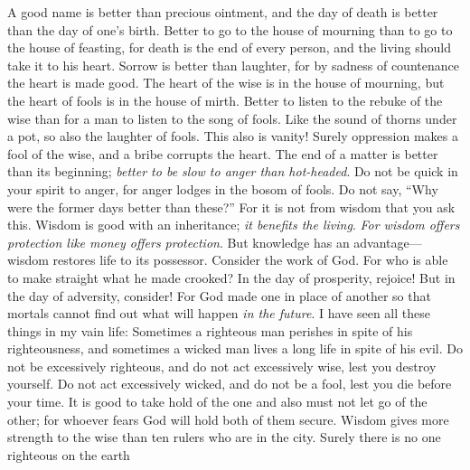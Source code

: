 \begin{biblechapter} %
 A good name is better than precious ointment, 
and the day of death is better than the day of one’s birth.
\verse Better to go to the house of mourning 
than to go to the house of feasting, 
for death is the end of every person, 
and the living should take it to his heart.
\verse Sorrow is better than laughter, 
for by sadness of countenance the heart is made good.
\verse The heart of the wise is in the house of mourning, 
but the heart of fools is in the house of mirth.
\verse Better to listen to the rebuke of the wise 
than for a man to listen to the song of fools.
\verse Like the sound of thorns under a pot, 
so also the laughter of fools. 
This also is vanity!
 Surely oppression makes a fool of the wise, 
and a bribe corrupts the heart.
\verse The end of a matter is better than its beginning; 
\textit{better to be slow to anger than hot-headed}.
\verse Do not be quick in your spirit to anger, 
for anger lodges in the bosom of fools.
\verse Do not say, “Why were the former days better than these?” 
For it is not from wisdom that you ask this.
\verse Wisdom is good with an inheritance; 
\textit{it benefits the living}.
\verse \textit{For wisdom offers protection like money offers protection}. 
But knowledge has an advantage—wisdom restores life to its possessor.
 Consider the work of God. 
For who is able to make straight what he made crooked?
\verse In the day of prosperity, rejoice! 
But in the day of adversity, consider! 
For God made one in place of another 
so that mortals cannot find out what will happen \textit{in the future}.
 I have seen all these things in my vain life: 
Sometimes a righteous man perishes in spite of his righteousness, 
and sometimes a wicked man lives a long life in spite of his evil.
\verse Do not be excessively righteous, 
and do not act excessively wise, lest you destroy yourself.
\verse Do not act excessively wicked, 
and do not be a fool, lest you die before your time.
\verse It is good to take hold of the one and also must not let go of the other; 
for whoever fears God will hold both of them secure.
 Wisdom gives more strength to the wise 
than ten rulers who are in the city.
\verse Surely there is no one righteous on the earth 

\end{biblechapter}
